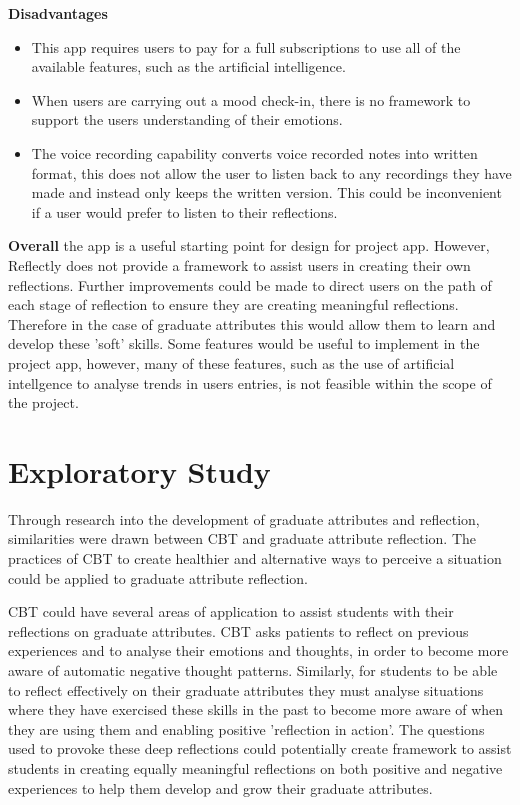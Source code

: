 \documentclass{l4proj}
\begin{document}
\textbf{Disadvantages}
\begin{itemize}
    \item This app requires users to pay for a full subscriptions to use all of the available features, such as the artificial intelligence. 
    \item When users are carrying out a mood check-in, there is no framework to support the users understanding of their emotions.
    \item The voice recording capability converts voice recorded notes into written format, this does not allow the user to listen back to any recordings they 
    have made and instead only keeps the written version. This could be inconvenient if a user would prefer to listen to their reflections.
\end{itemize}

\textbf{Overall} the app is a useful starting point for design for project app. However, Reflectly does not provide a framework to assist users in creating their own reflections. Further improvements could be made to direct users on the path of each stage of reflection to ensure they are creating meaningful reflections. Therefore in the case of graduate attributes this would allow them to learn and develop these 'soft' skills. Some features would be useful to implement in the project app, however, many of these features, such as the use of artificial intellgence to analyse trends in users entries, is not feasible within the scope of the project.

\chapter{Exploratory Study} \label{ExploratoryStudy}

Through research into the development of graduate attributes and reflection, similarities were drawn between CBT and graduate attribute reflection. The practices of CBT to create healthier and alternative ways to perceive a situation could be applied to graduate attribute reflection.

CBT could have several areas of application to assist students with their reflections on graduate attributes. CBT asks patients to reflect on previous experiences and to analyse their emotions and thoughts, in order to become more aware of automatic negative thought patterns. Similarly, for students to be able to reflect effectively on their graduate attributes they must analyse situations where they have exercised these skills in the past to become more aware of when they are using them and enabling positive 'reflection in action'. The questions used to provoke these deep reflections could potentially create framework to assist students in creating equally meaningful reflections on both positive and negative experiences to help them develop and grow their graduate attributes.
\end{document}
